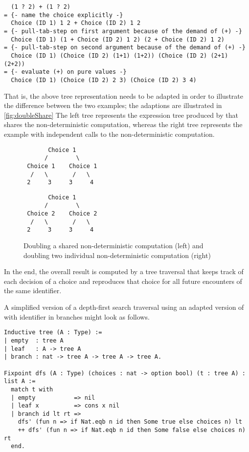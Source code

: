\begin{verbatim}
  (1 ? 2) + (1 ? 2)
= {- name the choice explicitly -}
  Choice (ID 1) 1 2 + Choice (ID 2) 1 2
= {- pull-tab-step on first argument because of the demand of (+) -}
  Choice (ID 1) (1 + Choice (ID 2) 1 2) (2 + Choice (ID 2) 1 2)
= {- pull-tab-step on second argument because of the demand of (+) -}
  Choice (ID 1) (Choice (ID 2) (1+1) (1+2)) (Choice (ID 2) (2+1) (2+2))
= {- evaluate (+) on pure values -}
  Choice (ID 1) (Choice (ID 2) 2 3) (Choice (ID 2) 3 4)
\end{verbatim}

That is, the above tree representation needs to be adapted in order to illustrate the difference between the two examples; the adaptions are illustrated in \autoref{fig:doubleShare}
The left tree represents the expression tree produced by  that shares the non-deterministic computation, whereas the right tree represents the example  with independent calls to the non-deterministic computation.

\begin{figure}[t]
\begin{minipage}{0.49\textwidth}
\begin{verbatim}
       Choice 1
      /        \
 Choice 1    Choice 1
  /   \       /   \
 2     3     3     4
\end{verbatim}
\end{minipage}
\begin{minipage}{0.49\textwidth}
\begin{verbatim}
       Choice 1
      /        \
 Choice 2    Choice 2
  /   \       /   \
 2     3     3     4
\end{verbatim}
\end{minipage}
\caption{Doubling a shared non-deterministic computation (left) and doubling two
  individual non-deterministic computation (right)}
\label{fig:doubleShare}
\end{figure}

In the end, the overall result is computed by a tree traversal that keeps track of each decision of a choice and reproduces that choice for all future encounters of the same identifier.

A simplified version of a depth-first search traversal using an adapted version of  with identifier in branches might look as follows.

\begin{verbatim}
Inductive tree (A : Type) :=
| empty  : tree A
| leaf   : A -> tree A
| branch : nat -> tree A -> tree A -> tree A.

Fixpoint dfs (A : Type) (choices : nat -> option bool) (t : tree A) : list A :=
  match t with
  | empty           => nil
  | leaf x          => cons x nil
  | branch id lt rt =>
    dfs' (fun n => if Nat.eqb n id then Some true else choices n) lt
    ++ dfs' (fun n => if Nat.eqb n id then Some false else choices n) rt
  end.
\end{verbatim}

